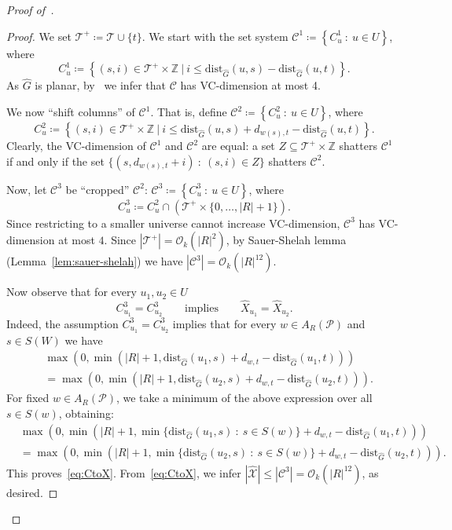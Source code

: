 \documentclass[11pt,a4paper]{article}
\newcommand{\Oh}{\mathcal{O}}
\newcommand{\dist}{\mathrm{dist}}
\renewcommand{\leq}{\leqslant}
\begin{document}
\begin{proof}[Proof of~]
  \begin{proof}
  We set $\mathcal{T}^+\coloneqq \mathcal{T}\cup \{t\}$.
  We start with the set system $\mathcal{C}^1\coloneqq\left\{C_u^1~\colon~u \in U\right\}$, where
  $$C_u^1\coloneqq\left\{(s,i) \in \mathcal{T}^+ \times \mathbb{Z}~|~i \leq \dist_{\widehat{G}}(u,s)-\dist_{\widehat{G}}(u,t)\right\}.$$
  As $\widehat{G}$ is planar, by~ we infer that $\mathcal{C}$ has VC-dimension at most 4.

  We now ``shift columns'' of $\mathcal{C}^1$. That is, define $\mathcal{C}^2 \coloneqq \left\{C_u^2~\colon~u \in U\right\}$, where
  $$C_u^2\coloneqq\left\{(s,i) \in \mathcal{T}^+ \times \mathbb{Z}~|~i \leq \dist_{\widehat{G}}(u,s)+d_{w(s),t}-\dist_{\widehat{G}}(u,t)\right\}.$$
  Clearly, the VC-dimension of $\mathcal{C}^1$ and $\mathcal{C}^2$ are equal: a set $Z \subseteq \mathcal{T}^+ \times \mathbb{Z}$
  shatters $\mathcal{C}^1$ if and only if the set $\{(s,d_{w(s),t}+i)~\colon~(s,i) \in Z\}$ shatters $\mathcal{C}^2$. 

  Now, let $\mathcal{C}^3$ be ``cropped'' $\mathcal{C}^2$:
  $\mathcal{C}^3 \coloneqq \left\{ C_u^3~\colon~u \in U\right\}$, where
  \[ C_u^3 \coloneqq C_u^2 \cap \left(\mathcal{T}^+ \times \{0,\ldots, |R|+1\}\right). \]
  Since restricting to a smaller universe cannot increase VC-dimension, $\mathcal{C}^3$ has VC-dimension at most $4$. 
  Since $|\mathcal{T}^+| = \Oh_k(|R|^2)$, by Sauer-Shelah lemma (Lemma~\ref{lem:sauer-shelah})
  we have $|\mathcal{C}^3| = \Oh_k(|R|^{12})$. 

  Now observe that for every $u_1,u_2 \in U$
  \begin{equation}\label{eq:CtoX}
   C^3_{u_1} = C^3_{u_2} \qquad \mathrm{implies} \qquad \widehat{X}_{u_1} = \widehat{X}_{u_2}. 
  \end{equation}
  Indeed, the assumption $C^3_{u_1} = C^3_{u_2}$ implies that
  for every $w \in A_R(\mathcal{P})$ and $s \in S(W)$ we have
  \begin{align*}
  & \max(0, \min(|R|+1, \dist_{\widehat{G}}(u_1,s)+d_{w,t}-\dist_{\widehat{G}}(u_1,t))) \\ 
  &= \max(0, \min(|R|+1, \dist_{\widehat{G}}(u_2,s)+d_{w,t}-\dist_{\widehat{G}}(u_2,t))).
\end{align*} 
  For fixed $w \in A_R(\mathcal{P})$, we take a minimum of the above expression over all $s \in S(w)$, obtaining:
  \begin{align*}
    & \max(0, \min(|R|+1, \min\{\dist_{\widehat{G}}(u_1,s)~\colon~s \in S(w)\}+d_{w,t}-\dist_{\widehat{G}}(u_1,t))) \\ 
    &= \max(0, \min(|R|+1, \min\{\dist_{\widehat{G}}(u_2,s)~\colon~s \in S(w)\}+d_{w,t}-\dist_{\widehat{G}}(u_2,t))).
  \end{align*} 
  This proves~\eqref{eq:CtoX}.
  From~\eqref{eq:CtoX}, we infer $|\widehat{\mathcal{X}}| \leq |\mathcal{C}^3| = \Oh_k(|R|^{12})$, as desired.
  \end{proof}


\end{proof}
\end{document}
